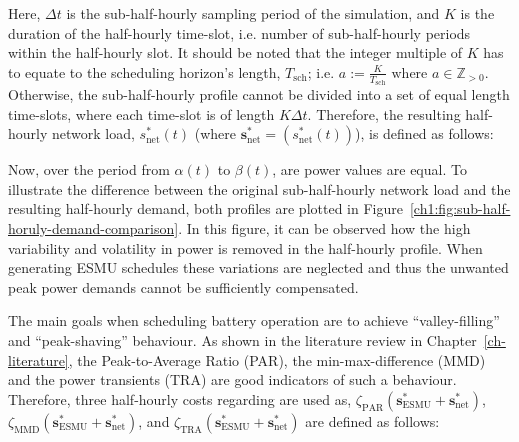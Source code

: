 Here, $\Delta t$ is the sub-half-hourly sampling period of the simulation, and $K$ is the duration of the half-hourly time-slot, i.e. number of sub-half-hourly periods within the half-hourly slot.
It should be noted that the integer multiple of $K$ has to equate to the scheduling horizon's length, $T_\text{sch}$; i.e. $a := \frac{K}{T_\text{sch}} \text{ where } a \in \mathbb{Z}_{>0}$.
Otherwise, the sub-half-hourly profile cannot be divided into a set of equal length time-slots, where each time-slot is of length $K\Delta t$.
Therefore, the resulting half-hourly network load, $s^{*}_\text{net}(t)$ (where $\textbf{s}^*_\text{net} = (s^*_\text{net}(t))$), is defined as follows:



Now, over the period from $\alpha(t)$ to $\beta(t)$, are power values are equal.
To illustrate the difference between the original sub-half-hourly network load and the resulting half-hourly demand, both profiles are plotted in Figure~\ref{ch1:fig:sub-half-horuly-demand-comparison}.
In this figure, it can be observed how the high variability and volatility in power is removed in the half-hourly profile.
When generating ESMU schedules these variations are neglected and thus the unwanted peak power demands cannot be sufficiently compensated.



The main goals when scheduling battery operation are to achieve ``valley-filling'' and ``peak-shaving'' behaviour.
As shown in the literature review in Chapter~\ref{ch-literature}, the Peak-to-Average Ratio (PAR), the min-max-difference (MMD) and the power transients (TRA) are good indicators of such a behaviour.
Therefore, three half-hourly costs regarding are used as, $\zeta_\text{PAR}(\textbf{s}^*_\text{ESMU} + \textbf{s}^*_\text{net})$, $\zeta_\text{MMD}(\textbf{s}^*_\text{ESMU} + \textbf{s}^*_\text{net})$, and $\zeta_\text{TRA}(\textbf{s}^*_\text{ESMU} + \textbf{s}^*_\text{net})$ are defined as follows:








